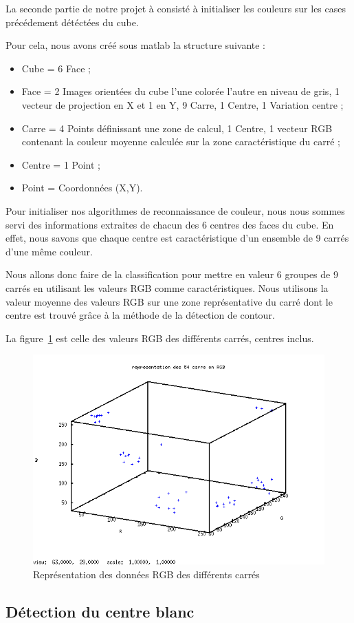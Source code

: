   La seconde partie de notre projet à consisté à initialiser les couleurs sur les cases précédement détéctées du cube. 

  Pour cela, nous avons créé sous matlab la structure suivante : 
\begin{itemize}
  \item Cube = 6 Face ; 
  \item Face = 2 Images orientées du cube l'une colorée l'autre en niveau de gris, 1 vecteur de projection en X et 1 en Y, 9 Carre, 1 Centre, 1 Variation centre ; 
  \item Carre = 4 Points définissant une zone de calcul, 1 Centre, 1 vecteur RGB contenant la couleur moyenne calculée sur la zone caractéristique du carré ; 
  \item Centre = 1 Point ; 
  \item Point = Coordonnées (X,Y). 
\end{itemize}

  Pour initialiser nos algorithmes de reconnaissance de couleur, nous nous sommes servi des informations extraites de chacun des 6 centres des faces du cube. 
  En effet, nous savons que chaque centre est caractéristique d'un ensemble de 9 carrés d'une même couleur. 

  Nous allons donc faire de la classification pour mettre en valeur 6 groupes de 9 carrés en utilisant les valeurs RGB comme caractéristiques. 
  Nous utilisons la valeur moyenne des valeurs RGB sur une zone représentative du carré dont le centre est trouvé grâce à la méthode de la détection de contour. 

  La figure~\ref{fig:RGB_init} est celle des valeurs RGB des différents carrés, centres inclus. 
  \begin{figure}[!ht]
    \centering
    \includegraphics[width=0.5\linewidth]{./Images/RGB_init.png}
    \caption{Représentation des données RGB des différents carrés}
    \label{fig:RGB_init}
  \end{figure}

  \subsection*{Détection du centre blanc}

